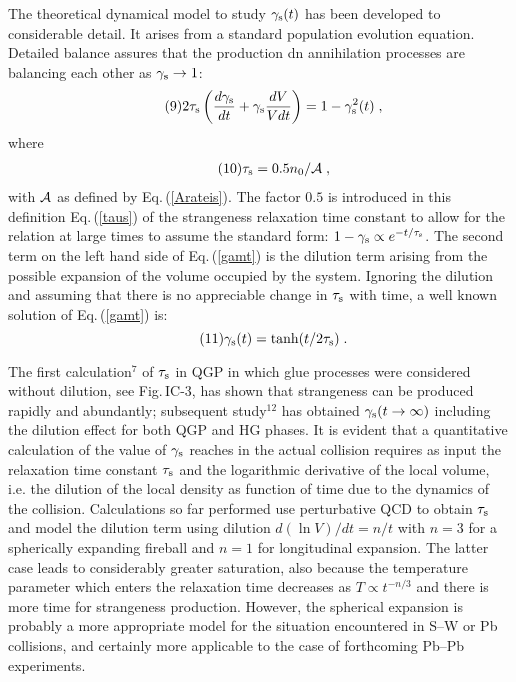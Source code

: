 \begin{mdframed}[linecolor=gray,roundcorner=12pt,backgroundcolor=Dandelion!15,linewidth=1pt,leftmargin=0cm,rightmargin=0cm,topline=true,bottomline=true,skipabove=12pt]
The theoretical dynamical model to study $\gamma_{\rm s}(t)$ has been
developed to considerable detail. It arises from a standard population
evolution equation. Detailed balance assures that the production dn
annihilation processes are balancing each other as $\gamma_{\rm s}\to 1$:
\begin{align*}\tag{9}
2\tau_{\rm s}\left( {d\gamma_{\rm s}\over dt}+\gamma_{\rm s}
          {dV\over Vdt}\right)=1-\gamma_{\rm s}^2(t)\;,
\label{gamt}
\end{align*}
where 
\begin{align*}\tag{10}
\tau_{\rm s}=0.5n_0/{\cal A}\;,
\label{taus}
\end{align*}
with $\cal A$ as defined by Eq.\,(\ref{Arateis}). The factor $0.5$ is
introduced in this  definition Eq.\,(\ref{taus}) of the strangeness
relaxation time constant to allow for the relation at large times to
assume the standard form: $1-\gamma_{\rm s}\propto e^{-t/\tau_{\rm s}}$.
The second term on the left hand side of Eq.\,(\ref{gamt}) is the
dilution term arising from the possible expansion of the volume occupied
by the system. Ignoring the dilution and assuming that there is no
appreciable change in $\tau_{\rm s}$ with time, a well known solution of
Eq.\,(\ref{gamt}) is:
\begin{equation}\tag{11}
\gamma_{\rm s}(t)=\tanh(t/2\tau_{\rm s})\;.
\end{equation}
 
The first calculation$^{7}$ of $\tau_{\rm s}$ in QGP in which glue
processes were considered without dilution, see Fig.\,IC-3, has shown
that
strangeness can be produced rapidly and abundantly; subsequent
study$^{12}$ has obtained $\gamma_{\rm s}(t\to\infty)$ including the
dilution effect for both QGP and HG phases. It is evident that a
quantitative calculation of the value of $\gamma_{\rm s}$ reaches in the
actual collision requires as input the relaxation time constant
$\tau_{\rm s}$ and the logarithmic derivative of the local volume, i.e.
the dilution of the local density as function of time due to the dynamics
of the collision. Calculations so far performed use perturbative QCD to
obtain $\tau_{\rm s}$ and model the dilution term using dilution $d(\ln
V)/dt=n/t$ with $n=3$ for a spherically expanding fireball and $n=1$ for
longitudinal expansion. The latter case leads to considerably greater
saturation, also because the temperature parameter which enters the
relaxation time decreases as $T\propto t^{-n/3}$ and there is more time
for strangeness production. However, the spherical expansion is probably
a more appropriate model for the situation encountered in S--W or Pb
collisions, and certainly more applicable to the case of forthcoming Pb--Pb experiments.
 

\end{mdframed}
